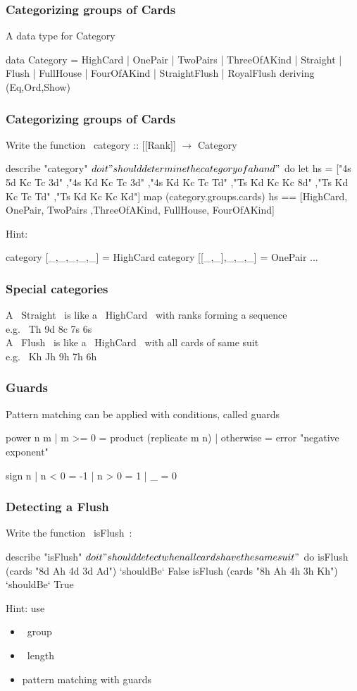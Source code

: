 \documentclass[11pt,xcolor={dvipsnames}]{beamer}
\newcommand{\vs}{\vspace{1em}}
\begin{document}
\begin{frame}[fragile]
\frametitle{Categorizing groups of Cards}
A data type for Category
\begin{haskell}
data Category = HighCard | OnePair | TwoPairs | ThreeOfAKind 
              | Straight | Flush | FullHouse | FourOfAKind 
              | StraightFlush | RoyalFlush
    deriving (Eq,Ord,Show)
\end{haskell}
\end{frame}
\begin{frame}[fragile]
\frametitle{Categorizing groups of Cards}
Write the function
 ~category :: [[Rank]] $\rightarrow$ Category~
\begin{hspec}
describe "category" $ do
    it "should determine the category of a hand" $ do
        let hs = ["4s 5d Kc Tc 3d"
                 ,"4s Kd Kc Tc 3d"
                 ,"4s Kd Kc Tc Td"
                 ,"Ts Kd Kc Kc 8d"
                 ,"Ts Kd Kc Tc Td"
                 ,"Ts Kd Kc Kc Kd"]
        map (category.groups.cards) hs ==  
                [HighCard, OnePair, TwoPairs
                ,ThreeOfAKind, FullHouse, FourOfAKind]
\end{hspec}
Hint:
\begin{haskell}
category [_,_,_,_,_]   = HighCard
category [[_,_],_,_,_] = OnePair
...
\end{haskell}
\end{frame}
\begin{frame}[fragile]
\frametitle{Special categories}
A ~Straight~ is like a ~HighCard~ with ranks forming a sequence\\
\vs
e.g. ~Th 9d 8c 7s 6s~\\
\vs
A ~Flush~ is like a ~HighCard~ with all cards of same suit\\
\vs
e.g. ~Kh Jh 9h 7h 6h~
\end{frame}
\begin{frame}[fragile]
\frametitle{Guards}
Pattern matching can be applied with conditions, called guards
\begin{haskell}
power n m | m >= 0    = product (replicate m n)
          | otherwise = error "negative exponent"   

sign n | n < 0 = -1
       | n > 0 =  1
       | _     =  0
\end{haskell}
\end{frame}
\begin{frame}[fragile]
\frametitle{Detecting a Flush}
Write the function ~isFlush~:
\begin{hspec}
describe "isFlush" $ do
    it "should detect when all cards have the same suit" $ do
        isFlush (cards "8d Ah 4d 3d Ad") `shouldBe` False
        isFlush (cards "8h Ah 4h 3h Kh") `shouldBe` True
\end{hspec}
Hint: use
\begin{itemize}
\item  ~group~
\item  ~length~
\item  pattern matching with guards
\end{itemize}
\end{frame}
\end{document}
